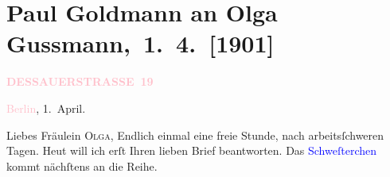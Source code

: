 

\renewcommand{\erwaehntePersonen}{Personen: Peter Cornelius, Paul Marx, Olga Schnitzler, Elisabeth Steinrück}
\renewcommand{\erwaehnteOrte}{Orte: Berlin, Dessauer Straße, Wien}
\renewcommand{\erwaehnteWerke}{Werke: Brautlieder}
\section[ Paul Goldmann an Olga Gussmann, 1. 4. {[}1901{]}]{Paul Goldmann an Olga Gussmann, 1. 4. {[}1901{]}}
\nopagebreak{}
\rehead{ }\normalsize\beginnumbering{}
\toendnotes[C]{\smallbreak\pagebreak[2]}
\toendnotes[C]{\smallbreak}
\pstart
           \noindent{}\raggedleft{}{\pb}\textcolor{gray}{\textbf{\textcolor{pink}{DESSAUERSTRASSE 19}{}\ledrightnote{\textcolor{pink}{Dessauer Straße}}}}\pend
           
\pstart
           \textcolor{pink}{Berlin}{}\ledrightnote{\textcolor{pink}{Berlin}}, 1. April.\pend
           
\pstart\center{}Liebes Fräulein \textsc{Olga},\pend
\pstart
           Endlich einmal eine freie Stunde, nach arbeitsſchweren Tagen. Heut will ich erſt Ihren lieben Brief beantworten. Das \textcolor{blue}{Schweſterchen}{}\ledrightnote{{$\rightarrow$}\textcolor{blue}{Elisabeth Steinrück}} kommt nächſtens an die
               Reihe.\pend
           
